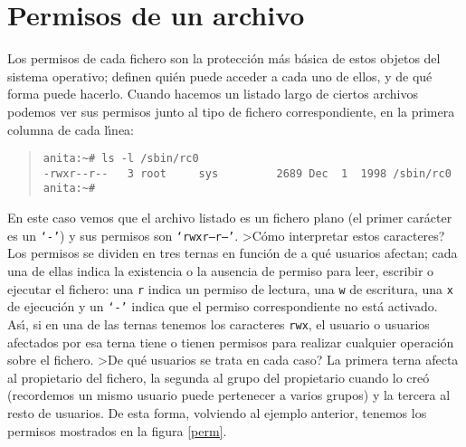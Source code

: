 \section{Permisos de un archivo}
Los permisos de cada fichero son la protecci\'on m\'as b\'asica de estos
objetos del sistema operativo; definen qui\'en puede acceder a cada uno de 
ellos, y de qu\'e forma puede hacerlo. Cuando hacemos un listado largo de 
ciertos archivos podemos ver sus permisos junto al tipo de fichero 
correspondiente, en la primera columna de cada l\'{\i}nea:
\tt
\begin{quote}
\begin{verbatim}
anita:~# ls -l /sbin/rc0
-rwxr--r--   3 root     sys         2689 Dec  1  1998 /sbin/rc0
anita:~#
\end{verbatim}
\end{quote}
\rm
En este caso vemos que el archivo listado es un fichero plano (el primer
car\'acter es un {\tt `-'}) y sus permisos son {\tt `rwxr--r--'}. >C\'omo
interpretar estos caracteres? Los permisos se dividen en tres ternas en
funci\'on de a qu\'e usuarios afectan; cada una de ellas indica la existencia o
la ausencia de permiso para leer, escribir o ejecutar el fichero: una {\tt r}
indica un permiso de lectura, una {\tt w} de escritura, una {\tt x} de 
ejecuci\'on y un {\tt `-'} indica que el permiso correspondiente no est\'a
activado. As\'{\i}, si en una de las ternas tenemos los caracteres {\tt rwx},
el usuario o usuarios afectados por esa terna tiene o tienen permisos para 
realizar cualquier operaci\'on sobre el fichero. >De qu\'e usuarios se trata en
cada caso? La primera terna afecta al propietario del fichero, la segunda al
grupo del propietario cuando lo cre\'o (recordemos un mismo usuario puede 
pertenecer a varios grupos) y la tercera al resto de usuarios. De esta forma,
volviendo al ejemplo anterior, tenemos los permisos mostrados en la figura
\ref{perm}.\\
